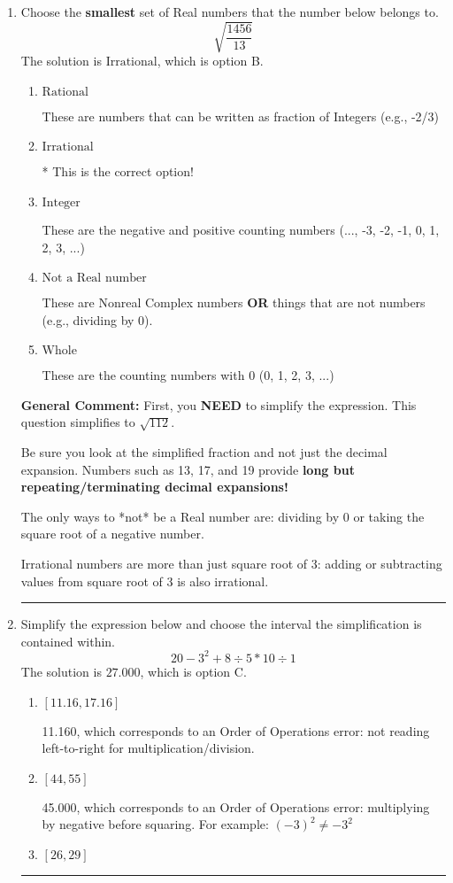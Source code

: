 \documentclass{extbook}[14pt]
\newcommand{\litem}[1]{\item #1

\rule{\textwidth}{0.4pt}}
\begin{document}
\begin{enumerate}\litem{
Choose the \textbf{smallest} set of Real numbers that the number below belongs to.
\[ \sqrt{\frac{1456}{13}} \]The solution is \( \text{Irrational} \), which is option B.\begin{enumerate}[label=\Alph*.]
\item \( \text{Rational} \)

These are numbers that can be written as fraction of Integers (e.g., -2/3)
\item \( \text{Irrational} \)

* This is the correct option!
\item \( \text{Integer} \)

These are the negative and positive counting numbers (..., -3, -2, -1, 0, 1, 2, 3, ...)
\item \( \text{Not a Real number} \)

These are Nonreal Complex numbers \textbf{OR} things that are not numbers (e.g., dividing by 0).
\item \( \text{Whole} \)

These are the counting numbers with 0 (0, 1, 2, 3, ...)
\end{enumerate}

\textbf{General Comment:} First, you \textbf{NEED} to simplify the expression. This question simplifies to $\sqrt{112}$. 
 
 Be sure you look at the simplified fraction and not just the decimal expansion. Numbers such as 13, 17, and 19 provide \textbf{long but repeating/terminating decimal expansions!} 
 
 The only ways to *not* be a Real number are: dividing by 0 or taking the square root of a negative number. 
 
 Irrational numbers are more than just square root of 3: adding or subtracting values from square root of 3 is also irrational.
}
\litem{
Simplify the expression below and choose the interval the simplification is contained within.
\[ 20 - 3^2 + 8 \div 5 * 10 \div 1 \]The solution is \( 27.000 \), which is option C.\begin{enumerate}[label=\Alph*.]
\item \( [11.16, 17.16] \)

 11.160, which corresponds to an Order of Operations error: not reading left-to-right for multiplication/division.
\item \( [44, 55] \)

 45.000, which corresponds to an Order of Operations error: multiplying by negative before squaring. For example: $(-3)^2 \neq -3^2$
\item \( [26, 29] \)


\end{enumerate}}
\end{enumerate}
\end{document}
